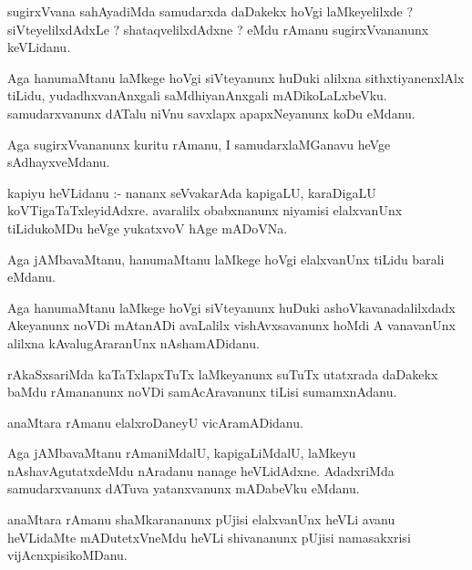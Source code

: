 \documentclass{article}
\begin{document}
\begin{mn}
sugirxVvana  sahAyadiMda  samudarxda  daDakekx  hoVgi  laMkeyelilxde ?  siVteyelilxdAdxLe ?  shataqvelilxdAdxne ?  eMdu  rAmanu  
sugirxVvananunx  keVLidanu.
\end{mn}

\begin{mn}
Aga  hanumaMtanu  laMkege  hoVgi  siVteyanunx  huDuki  alilxna  sithxtiyanenxlAlx  tiLidu,  yudadhxvanAnxgali  saMdhiyanAnxgali  
mADikoLaLxbeVku.  samudarxvanunx  dATalu  niVnu  savxlapx  apapxNeyanunx  koDu  eMdanu.
\end{mn}

\begin{mn}
Aga  sugirxVvananunx  kuritu  rAmanu,  I  samudarxlaMGanavu  heVge  sAdhayxveMdanu.
\end{mn}

\begin{mn}
kapiyu  heVLidanu :- nananx  seVvakarAda  kapigaLU,  karaDigaLU  koVTigaTaTxleyidAdxre.  avaralilx  obabxnanunx  niyamisi  
elalxvanUnx  tiLidukoMDu  heVge  yukatxvoV  hAge  mADoVNa.
\end{mn}

\begin{mn}
Aga  jAMbavaMtanu,  hanumaMtanu  laMkege  hoVgi  elalxvanUnx  tiLidu  barali  eMdanu.
\end{mn}

\begin{mn}
Aga  hanumaMtanu  laMkege  hoVgi  siVteyanunx  huDuki  ashoVkavanadalilxdadx  Akeyanunx  noVDi  mAtanADi  avaLalilx  
vishAvxsavanunx  hoMdi  A  vanavanUnx  alilxna  kAvalugAraranUnx  nAshamADidanu.
\end{mn}

\begin{mn}
rAkaSxsariMda  kaTaTxlapxTuTx  laMkeyanunx  suTuTx  utatxrada  daDakekx  baMdu  rAmananunx  noVDi  samAcAravanunx  tiLisi  sumamxnAdanu.
\end{mn}

\begin{mn}
anaMtara  rAmanu  elalxroDaneyU  vicAramADidanu.
\end{mn}

\begin{mn}
Aga  jAMbavaMtanu  rAmaniMdalU,  kapigaLiMdalU,  laMkeyu  nAshavAgutatxdeMdu  nAradanu  nanage  heVLidAdxne.  AdadxriMda  
samudarxvanunx  dATuva  yatanxvanunx  mADabeVku  eMdanu.
\end{mn}

\begin{mn}
anaMtara  rAmanu  shaMkarananunx  pUjisi  elalxvanUnx  heVLi  avanu  heVLidaMte  mADutetxVneMdu  heVLi  shivananunx  pUjisi  
namasakxrisi  vijAcnxpisikoMDanu.
\end{mn}
\end{document}
